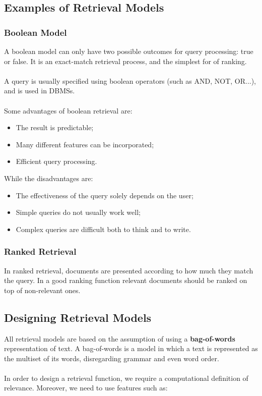 \documentclass{article}
\begin{document}
\subsection{Examples of Retrieval Models}
\subsubsection{Boolean Model}
A boolean model can only have two possible outcomes for query processing: true or false. It is an exact-match retrieval process, and the simplest for of ranking. \\ \\
A query is usually specified using boolean operators (such as AND, NOT, OR...), and is used in DBMSs. \\ \\
Some advantages of boolean retrieval are:

\begin{itemize}
	\item The result is predictable;
	\item Many different features can be incorporated;
	\item Efficient query processing.
\end{itemize}
While the disadvantages are:

\begin{itemize}
	\item The effectiveness of the query solely depends on the user;
	\item Simple queries do not usually work well;
	\item Complex queries are difficult both to think and to write.
\end{itemize}

\subsubsection{Ranked Retrieval}
In ranked retrieval, documents are presented according to how much they match the query. In a good ranking function relevant documents should be ranked on top of non-relevant ones.

\subsection{Designing Retrieval Models}
All retrieval models are based on the assumption of using a \textbf{bag-of-words} representation of text. A bag-of-words is a model in which a text is represented as the multiset of its words, disregarding grammar and even word order. \\ \\
In order to design a retrieval function, we require a computational definition of relevance. Moreover, we need to use features such as:
\end{document}
